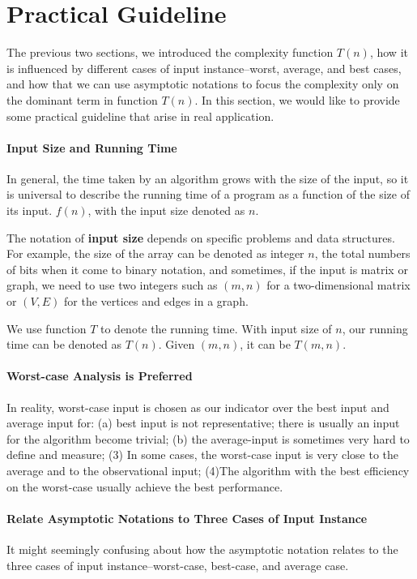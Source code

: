 \documentclass[../main.tex]{subfiles}
\begin{document}
\section{Practical Guideline}
The previous two sections, we introduced the complexity function $T(n)$, how it is influenced by different cases of input instance--worst, average, and best cases, and how that we can use asymptotic notations to focus the complexity only on the dominant term in function $T(n)$. In this section, we would like to provide some practical guideline that arise in real application. 
\paragraph{Input Size and Running Time}
In general, the time taken by an algorithm grows with the size of the input, so it is universal to describe the running time of a program as a function of the size of its input. $f(n)$, with the input size denoted as $n$.

The notation of \textbf{input size} depends on specific problems and data structures. For example, the size of the array can be denoted as integer $n$, the total numbers of bits when it come to binary notation, and sometimes, if the input is matrix or graph, we need to use two integers such as $(m, n)$ for a two-dimensional matrix or $(V, E)$ for the vertices and edges in a graph. 

We use function $T$ to denote the running time. With input size of $n$, our running time can be denoted as $T(n)$. Given $(m, n)$, it can be $T(m, n)$. 

\paragraph{Worst-case Analysis is Preferred} 
In reality, worst-case input is chosen as our indicator over the best input and average input for: (a) best input is not representative; there is usually an input for the algorithm become trivial; (b) the average-input is sometimes very hard to define and measure; (3) In some cases, the worst-case input is very close to the average and to the observational input; (4)The algorithm with the best efficiency on the worst-case usually achieve the best performance. 

\paragraph{Relate Asymptotic Notations to Three Cases of Input Instance}
It might seemingly confusing about how the asymptotic notation relates to the three cases of input instance--worst-case, best-case, and average case. 
\end{document}
